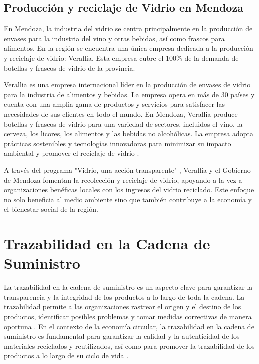 \documentclass[main.tex]{subfiles}
\begin{document}
\subsection{Producción y reciclaje de Vidrio en Mendoza}

En Mendoza, la industria del vidrio se centra principalmente en la producción de envases para la industria del vino y otras bebidas, así como frascos para alimentos. En la región se encuentra una única empresa dedicada a la producción y reciclaje de vidrio: Verallia. Esta empresa cubre el 100\% de la demanda de botellas y frascos de vidrio de la provincia.

Verallia es una empresa internacional líder en la producción de envases de vidrio para la industria de alimentos y bebidas. La empresa opera en más de 30 países y cuenta con una amplia gama de productos y servicios para satisfacer las necesidades de sus clientes en todo el mundo. En Mendoza, Verallia produce botellas y frascos de vidrio para una variedad de sectores, incluidos el vino, la cerveza, los licores, los alimentos y las bebidas no alcohólicas. La empresa adopta prácticas sostenibles y tecnologías innovadoras para minimizar su impacto ambiental y promover el reciclaje de vidrio \cite{verallia2022vidrio}.

A través del programa "Vidrio, una acción transparente" \cite{vidriotransparente2024mendoza}, Verallia y el Gobierno de Mendoza fomentan la recolección y reciclaje de vidrio, apoyando a la vez a organizaciones benéficas locales con los ingresos del vidrio reciclado. Este enfoque no solo beneficia al medio ambiente sino que también contribuye a la economía y el bienestar social de la región.

\section{Trazabilidad en la Cadena de Suministro}

La trazabilidad en la cadena de suministro es un aspecto clave para garantizar la transparencia y la integridad de los productos a lo largo de toda la cadena. La trazabilidad permite a las organizaciones rastrear el origen y el destino de los productos, identificar posibles problemas y tomar medidas correctivas de manera oportuna \cite{cepeda2010trazabilidad}. En el contexto de la economía circular, la trazabilidad en la cadena de suministro es fundamental para garantizar la calidad y la autenticidad de los materiales reciclados y reutilizados, así como para promover la trazabilidad de los productos a lo largo de su ciclo de vida \cite{melendez2021economia}.
\end{document}
